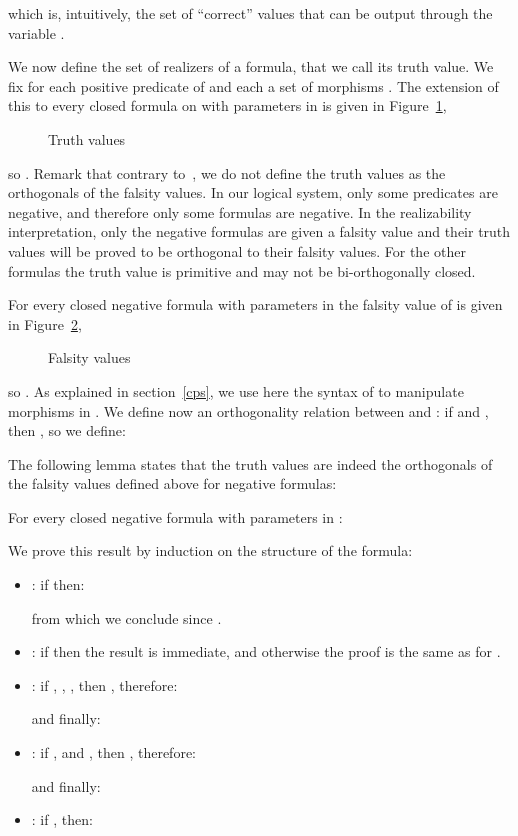 \documentclass{CSML}
\begin{document}
which is, intuitively, the set of ``correct'' values that can be output through the variable .\par
We now define the set of realizers of a formula, that we call its truth value. We fix for each positive predicate  of  and each  a set of morphisms . The extension of this to every closed formula  on  with parameters in  is given in Figure~\ref{TruthValues},
\begin{figure}


\caption{Truth values}
\label{TruthValues}
\end{figure}
so . Remark that contrary to~\cite{KrivinePanoramas}, we do not define the truth values as the orthogonals of the falsity values. In our logical system, only some predicates are negative, and therefore only some formulas are negative. In the realizability interpretation, only the negative formulas are given a falsity value and their truth values will be proved to be orthogonal to their falsity values. For the other formulas the truth value is primitive and may not be bi-orthogonally closed.\par
For every closed negative formula  with parameters in  the falsity value of  is given in Figure~\ref{FalsityValues},
\begin{figure}


\caption{Falsity values}
\label{FalsityValues}
\end{figure}
so . As explained in section~\ref{cps}, we use here the syntax of  to manipulate morphisms in . We define now an orthogonality relation between  and : if  and , then , so we define:

The following lemma states that the truth values are indeed the orthogonals of the falsity values defined above for negative formulas:
\begin{lem}
\label{orthogonal}
For every closed negative formula  with parameters in :

\end{lem}
\proof
We prove this result by induction on the structure of the formula:
\begin{itemize}
\item: if  then:

from which we conclude since .
\item: if  then the result is immediate, and otherwise the proof is the same as for .
\item: if , , , then , therefore:

and finally:

\item: if ,  and , then , therefore:

and finally:

\item: if , then:

\end{itemize}
\end{document}
